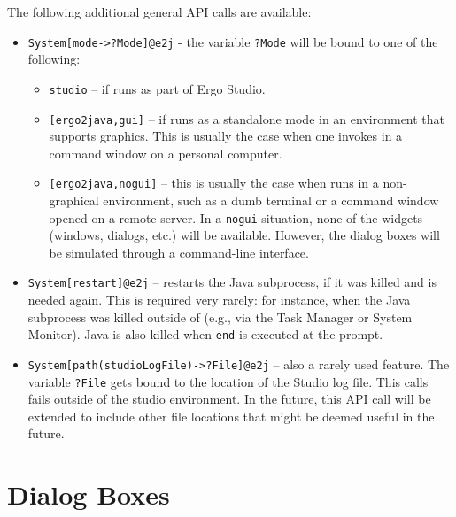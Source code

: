 The following additional general API calls are available:
\begin{itemize}
\item  \texttt{System[mode->?Mode]@\bs{}e2j} - the variable \texttt{?Mode} will be bound to one
  of the following:
  \begin{itemize}
  \item    \texttt{studio} -- if \ERGO runs as part of Ergo Studio.
  \item    \texttt{[ergo2java,gui]} -- if \ERGO runs as a standalone mode
    in an environment that supports graphics. This is usually the case when
    one invokes \ERGO in a command window on a personal computer.
  \item \texttt{[ergo2java,nogui]} -- this is usually the case when \ERGO
    runs in a non-graphical environment, such as a dumb terminal or a
    command window opened on a remote server.
    In a \texttt{nogui} situation, none of the widgets (windows, dialogs,
    etc.) will be available. However, the dialog boxes will be simulated
    through a command-line interface.
  \end{itemize}
  \item \texttt{System[restart]@\bs{}e2j} -- restarts the Java subprocess, if it was
    killed and is needed again. This is required very rarely: for instance,
    when the Java subprocess was killed outside of \ERGO (e.g., via the Task
    Manager or System Monitor). Java is also killed when
    \texttt{\bs{}end} is executed at the \ERGO prompt.
  \item \texttt{System[path(studioLogFile)->?File]@\bs{}e2j} -- also a rarely used
    feature. The variable \texttt{?File} gets
    bound to the location of the Studio log file. This calls fails outside
    of the studio environment. In the future, this API call will be extended
    to include other file locations that might be deemed useful in the
    future.
\end{itemize}

\section{Dialog Boxes}

